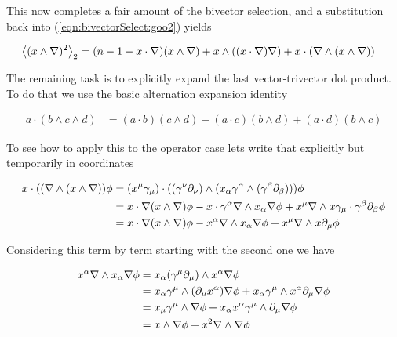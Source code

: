 This now completes a fair amount of the bivector selection, and a substitution back into (\ref{eqn:bivectorSelect:goo2}) yields

\begin{align}\label{eqn:bivectorSelect:goo6}
{\left\langle{{ (x \wedge \nabla)^2 }}\right\rangle}_{2}
&=
(n-1 - x \cdot \nabla) (x \wedge \nabla) + x \wedge ((x \cdot \nabla) \nabla ) 
+ x \cdot (\nabla \wedge (x \wedge \nabla)) 
\end{align}

The remaining task is to explicitly expand the last vector-trivector dot product.  To do that we use the basic alternation expansion identity

\begin{align}\label{eqn:bivectorSelect:goo7}
a \cdot (b \wedge c \wedge d)
&= 
(a \cdot b) (c \wedge d)
-(a \cdot c) (b \wedge d)
+(a \cdot d) (b \wedge c)
\end{align}

To see how to apply this to the operator case lets write that explicitly but temporarily in coordinates

\begin{align*}
x \cdot ((\nabla \wedge (x \wedge \nabla)) \phi
&=
(x^\mu \gamma_\mu) \cdot ((\gamma^\nu \partial_\nu ) \wedge (x_\alpha \gamma^\alpha \wedge (\gamma^\beta \partial_\beta))) \phi \\
&=
x \cdot \nabla (x \wedge \nabla) \phi
-
x \cdot \gamma^\alpha \nabla \wedge x_\alpha \nabla \phi
+
x^\mu \nabla \wedge x \gamma_\mu \cdot \gamma^\beta \partial_\beta  \phi \\
&=
x \cdot \nabla (x \wedge \nabla) \phi
-
x^\alpha \nabla \wedge x_\alpha \nabla \phi
+
x^\mu \nabla \wedge x \partial_\mu  \phi
\end{align*}

Considering this term by term starting with the second one we have

\begin{align*}
x^\alpha \nabla \wedge x_\alpha \nabla \phi
&=
x_\alpha (\gamma^\mu \partial_\mu) \wedge x^\alpha \nabla \phi \\
&=
x_\alpha \gamma^\mu \wedge (\partial_\mu x^\alpha) \nabla \phi 
+x_\alpha \gamma^\mu \wedge x^\alpha \partial_\mu \nabla \phi  \\
&=
x_\mu \gamma^\mu \wedge \nabla \phi 
+x_\alpha x^\alpha \gamma^\mu \wedge \partial_\mu \nabla \phi  \\
&=
x \wedge \nabla \phi 
+x^2 \nabla \wedge \nabla \phi  \\
\end{align*}

